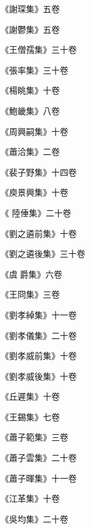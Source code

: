 \begin{pinyinscope}
 《謝琛集》五卷



 《謝鬱集》五卷



 《王僧孺集》三十卷



 《張率集》三十卷



 《楊眺集》十卷



 《鮑畿集》八卷



 《周興嗣集》十卷



 《蕭洽集》二卷



 《裴子野集》十四卷



 《庾景興集》十卷



 《
 陸倕集》二十卷



 《劉之遴前集》十卷



 《劉之遴後集》三十卷



 《虞爵集》六卷



 《王冏集》三卷



 《劉孝綽集》十一卷



 《劉孝儀集》二十卷



 《劉孝威前集》十卷



 《劉孝威後集》十卷



 《丘遲集》十卷



 《王錫集》七卷



 《蕭子範集》三卷



 《蕭子雲集》二十卷



 《蕭子暉集》十一卷



 《江革集》十卷



 《吳均集》二十卷




\end{pinyinscope}
